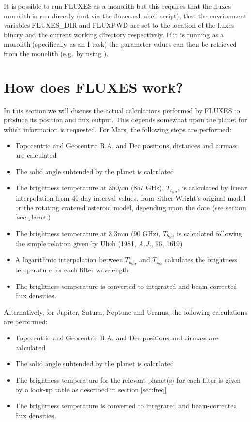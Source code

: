 \documentclass[11pt,twoside]{starlink}
\begin{document}
It is possible to run FLUXES as a monolith but this requires
that the fluxes monolith is run directly (not via the fluxes.csh
shell script), that the envrionment variables
FLUXES\_DIR and FLUXPWD are set to the location of the fluxes binary
and the current working directory respectively. If it is running
as a monolith (specifically as an I-task) the parameter values can
then be retrieved from the monolith (e.g.\ by using
 ).

\section{How does FLUXES work?}
\label{sec:howfluxesworks}

In this section we will discuss the actual calculations performed by FLUXES to produce its position and flux output.  This depends somewhat upon the planet for which information is requested.  For Mars, the following steps are performed:

\begin{itemize}
\item{Topocentric and Geocentric R.A. and Dec positions, distances and airmass are calculated}
\item{The solid angle subtended by the planet is calculated}
\item{The brightness temperature at 350$\mu$m (857 GHz), $T_{b_{857}}$,  is calculated by linear interpolation from 40-day interval values, from either Wright's original model or the rotating cratered asteroid model, depending upon the date (see section \ref{sec:planet})}
\item{The brightness temperature at 3.3mm (90 GHz), $T_{b_{90}}$, is calculated following the simple relation given by Ulich (1981, \textit{A.J.}, 86, 1619)}
\item{A logarithmic interpolation between $T_{b_{857}}$ and $T_{b_{90}}$ calculates the brightness temperature for each filter wavelength}
\item{The brightness temperature is converted to integrated and beam-corrected flux densities.}
\end{itemize}

Alternatively, for Jupiter, Saturn, Neptune and Uranus, the following calculations are performed:

\begin{itemize}
\item{Topocentric and Geocentric R.A. and Dec positions and airmass are calculated}
\item{The solid angle subtended by the planet is calculated}
\item{The brightness temperature for the relevant planet(s) for each filter is given by a look-up table as described in section \ref{sec:freq}}
\item{The brightness temperature is converted to integrated and beam-corrected flux densities.}
\end{itemize}
\end{document}
